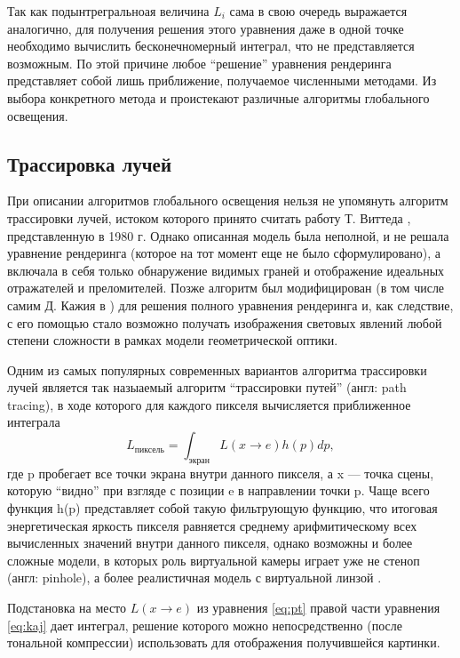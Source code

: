 \documentclass[12pt]{article}
\begin{document}
Так как подынтрегральноая величина $L_i$ сама в свою очередь выражается аналогично, для получения решения этого уравнения даже в одной точке необходимо вычислить бесконечномерный интеграл, что не представляется возможным. По этой причине любое ``решение'' уравнения рендеринга представляет собой лишь приближение, получаемое численными методами. Из выбора конкретного метода и проистекают различные алгоритмы глобального освещения.
\subsection{Трассировка лучей}
При описании алгоритмов глобального освещения нельзя не упомянуть алгоритм трассировки лучей, истоком которого принято считать работу Т. Виттеда \cite{Witt80}, представленную в 1980 г. Однако описанная модель была неполной, и не решала уравнение рендеринга (которое на тот момент еще не было сформулировано), а включала в себя только обнаружение видимых граней и отображение идеальных отражателей и преломителей. Позже алгоритм был модифицирован (в том числе самим Д. Кажия в \cite{Kaj86}) для решения полного уравнения рендеринга и, как следствие, с его помощью стало возможно получать изображения световых явлений любой степени сложности в рамках модели геометрической оптики.

Одним из самых популярных современных вариантов алгоритма трассировки лучей является так назыаемый алгоритм ``трассировки путей'' (англ: path tracing), в ходе которого для каждого пикселя вычисляется приближенное интеграла
\begin{equation}
L_{\text{пиксель}} = \int_{\text{экран}} L(x \rightarrow e) h(p) dp,\label{eq:pt}
\end{equation}
где p пробегает все точки экрана внутри данного пикселя, а x --- точка сцены, которую ``видно'' при взгляде с позиции e в направлении точки p. Чаще всего функция h(p) представляет собой такую фильтрующую функцию, что итоговая энергетическая яркость пикселя равняется среднему арифмитическому всех вычисленных значений внутри данного пикселя, однако возможны и более сложные модели, в которых роль виртуальной камеры играет уже не стеноп (англ: pinhole), а более реалистичная модель с виртуальной линзой \cite{Kolb95}.

Подстановка на место $L(x \rightarrow e)$ из уравнения \eqref{eq:pt} правой части уравнения \eqref{eq:kaj} дает интеграл, решение которого можно непосредственно (после тональной компрессии) использовать для отображения получившейся картинки.
\end{document}
